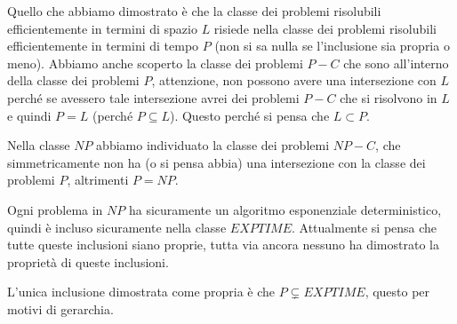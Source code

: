 \documentclass{article}
\begin{document}
Quello che abbiamo dimostrato è che la classe dei problemi risolubili efficientemente in termini
di spazio $L$ risiede nella classe dei problemi risolubili efficientemente in termini di tempo $P$
(non si sa nulla se l'inclusione sia propria o meno). Abbiamo anche scoperto la classe
dei problemi $P-C$ che sono all'interno della classe dei problemi $P$, attenzione, non possono
avere una intersezione con $L$ perché se avessero tale intersezione avrei dei problemi $P-C$
che si risolvono in $L$ e quindi $P=L$ (perché $P\subseteq L$). Questo perché si pensa che
$L\subset P$.

Nella classe $NP$ abbiamo individuato la classe dei problemi $NP-C$, che simmetricamente
non ha (o si pensa abbia) una intersezione con la classe dei problemi $P$, altrimenti $P=NP$.

Ogni problema in $NP$ ha sicuramente un algoritmo esponenziale deterministico, quindi è incluso
sicuramente nella classe $EXPTIME$. Attualmente si pensa che tutte queste inclusioni siano proprie,
tutta via ancora nessuno ha dimostrato la proprietà di queste inclusioni.

L'unica inclusione dimostrata come propria è che $P\subsetneq EXPTIME$, questo per motivi di gerarchia.
\end{document}
